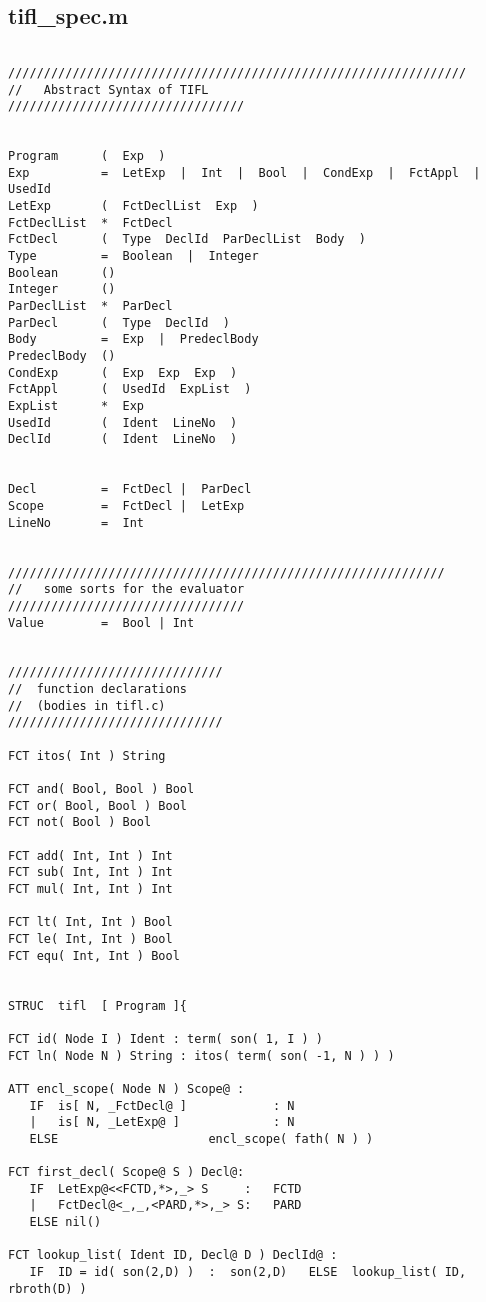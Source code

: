 \subsection{tifl\_spec.m}
\begin{verbatim}

////////////////////////////////////////////////////////////////
//   Abstract Syntax of TIFL 
/////////////////////////////////


Program      (  Exp  )
Exp          =  LetExp  |  Int  |  Bool  |  CondExp  |  FctAppl  |  UsedId
LetExp       (  FctDeclList  Exp  )
FctDeclList  *  FctDecl
FctDecl      (  Type  DeclId  ParDeclList  Body  )
Type         =  Boolean  |  Integer
Boolean      ()
Integer      ()
ParDeclList  *  ParDecl
ParDecl      (  Type  DeclId  )
Body         =  Exp  |  PredeclBody
PredeclBody  () 
CondExp      (  Exp  Exp  Exp  )
FctAppl      (  UsedId  ExpList  )
ExpList      *  Exp
UsedId       (  Ident  LineNo  )
DeclId       (  Ident  LineNo  )


Decl         =  FctDecl |  ParDecl
Scope        =  FctDecl |  LetExp
LineNo       =  Int


/////////////////////////////////////////////////////////////
//   some sorts for the evaluator
/////////////////////////////////
Value        =  Bool | Int


//////////////////////////////
//  function declarations  
//  (bodies in tifl.c)
//////////////////////////////

FCT itos( Int ) String

FCT and( Bool, Bool ) Bool
FCT or( Bool, Bool ) Bool
FCT not( Bool ) Bool

FCT add( Int, Int ) Int
FCT sub( Int, Int ) Int
FCT mul( Int, Int ) Int

FCT lt( Int, Int ) Bool
FCT le( Int, Int ) Bool
FCT equ( Int, Int ) Bool


STRUC  tifl  [ Program ]{

FCT id( Node I ) Ident : term( son( 1, I ) )
FCT ln( Node N ) String : itos( term( son( -1, N ) ) )

ATT encl_scope( Node N ) Scope@ :
   IF  is[ N, _FctDecl@ ]            : N
   |   is[ N, _LetExp@ ]             : N 
   ELSE                     encl_scope( fath( N ) )

FCT first_decl( Scope@ S ) Decl@:
   IF  LetExp@<<FCTD,*>,_> S     :   FCTD
   |   FctDecl@<_,_,<PARD,*>,_> S:   PARD
   ELSE nil()

FCT lookup_list( Ident ID, Decl@ D ) DeclId@ :
   IF  ID = id( son(2,D) )  :  son(2,D)   ELSE  lookup_list( ID, rbroth(D) )


\end{verbatim}
